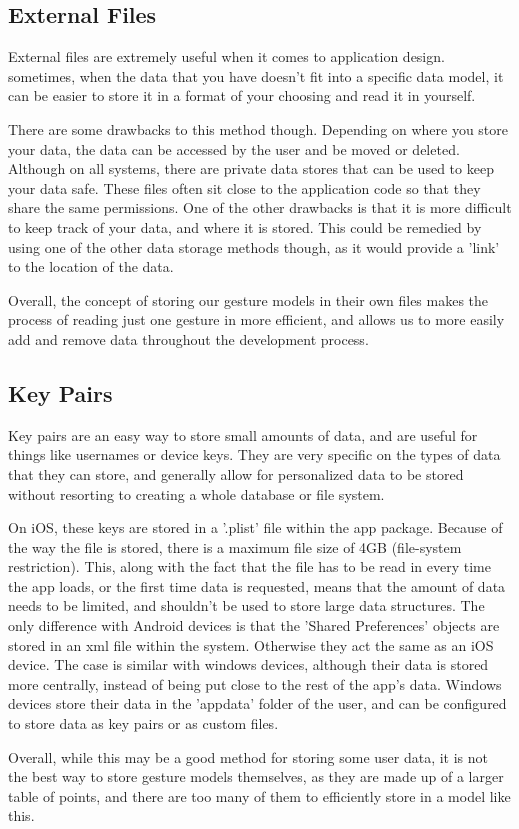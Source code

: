 \documentclass[onecolumn, draftclsnofoot,10pt, journal, letterpaper]{IEEEtran}
\begin{document}
    \subsection{External Files}
    External files are extremely useful when it comes to application design. sometimes, when the data that you have doesn't fit into a specific data model, it can be easier to store it in a format of your choosing and read it in yourself.\par There are some drawbacks to this method though. Depending on where you store your data, the data can be accessed by the user and be moved or deleted. Although on all systems, there are private data stores that can be used to keep your data safe. These files often sit close to the application code so that they share the same permissions. One of the other drawbacks is that it is more difficult to keep track of your data, and where it is stored. This could be remedied by using one of the other data storage methods though, as it would provide a 'link' to the location of the data.\par
    Overall, the concept of storing our gesture models in their own files makes the process of reading just one gesture in more efficient, and allows us to more easily add and remove data throughout the development process.
    
    \subsection{Key Pairs}
    Key pairs are an easy way to store small amounts of data, and are useful for things like usernames or device keys. They are very specific on the types of data that they can store, and generally allow for personalized data to be stored without resorting to creating a whole database or file system.\par
    On iOS, these keys are stored in a '.plist' file within the app package. Because of the way the file is stored, there is a maximum file size of 4GB (file-system restriction). \cite{noauthor_ios_2019} This, along with the fact that the file has to be read in every time the app loads, or the first time data is requested, means that the amount of data needs to be limited, and shouldn't be used to store large data structures. The only difference with Android devices is that the 'Shared Preferences' objects are stored in an xml file within the system. \cite{tarun_kumar_top_2018} Otherwise they act the same as an iOS device. \cite{obaro_ogbo_how_2016} The case is similar with windows devices, although their data is stored more centrally, instead of being put close to the rest of the app's data. Windows devices store their data in the 'appdata' folder of the user, and can be configured to store data as key pairs or as custom files. \cite{noauthor_applicationdata_2019}\par
    Overall, while this may be a good method for storing some user data, it is not the best way to store gesture models themselves, as they are made up of a larger table of points, and there are too many of them to efficiently store in a model like this.
    
\end{document}

